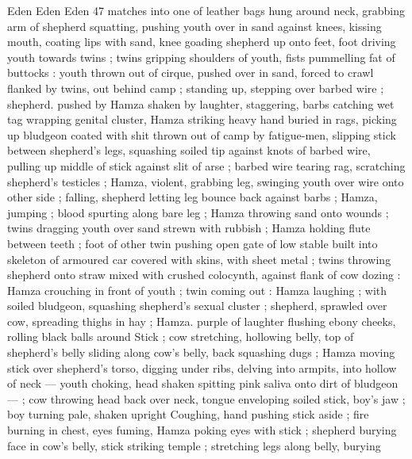 Eden Eden Eden 47
matches into one of leather bags hung around neck, grabbing arm of
shepherd squatting, pushing youth over in sand against knees,
kissing mouth, coating lips with sand, knee goading shepherd up
onto feet, foot driving youth towards twins ; twins gripping shoulders
of youth, fists pummelling fat of buttocks : youth thrown out of
cirque, pushed over in sand, forced to crawl flanked by twins, out
behind camp ; standing up, stepping over barbed wire ; shepherd.
pushed by Hamza shaken by laughter, staggering, barbs catching wet
tag wrapping genital cluster, Hamza striking heavy hand buried in
rags, picking up bludgeon coated with shit thrown out of camp by
fatigue-men, slipping stick between shepherd's legs, squashing
soiled tip against knots of barbed wire, pulling up middle of stick
against slit of arse ; barbed wire tearing rag, scratching shepherd's
testicles ; Hamza, violent, grabbing leg, swinging youth over wire
onto other side ; falling, shepherd letting leg bounce back against
barbs ; Hamza, jumping ; blood spurting along bare leg ; Hamza
throwing sand onto wounds ; twins dragging youth over sand strewn
with rubbish ; Hamza holding flute between teeth ; foot of other twin
pushing open gate of low stable built into skeleton of armoured car
covered with skins, with sheet metal ; twins throwing shepherd onto
straw mixed with crushed colocynth, against flank of cow dozing :
Hamza crouching in front of youth ; twin coming out : Hamza
laughing ; with soiled bludgeon, squashing shepherd's sexual cluster
; shepherd, sprawled over cow, spreading thighs in hay ; Hamza.
purple of laughter flushing ebony cheeks, rolling black balls around
Stick ; cow stretching, hollowing belly, top of shepherd's belly sliding
along cow's belly, back squashing dugs ; Hamza moving stick over
shepherd's torso, digging under ribs, delving into armpits, into
hollow of neck — youth choking, head shaken spitting pink saliva
onto dirt of bludgeon — ; cow throwing head back over neck, tongue
enveloping soiled stick, boy's jaw ; boy turning pale, shaken upright
Coughing, hand pushing stick aside ; fire burning in chest, eyes
fuming, Hamza poking eyes with stick ; shepherd burying face in
cow's belly, stick striking temple ; stretching legs along belly, burying

